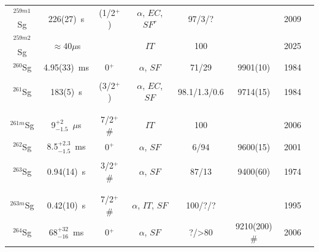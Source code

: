 \begin{center}
\begin{longtable}{c|ccccccl}
$^{259m1}$Sg& 226(27)~s		& (1/2$^+$)	&$\alpha$, $EC$, $SF^r$&97/3/?  &    		        &2009	&{\tiny\cite{Hessberger2009,Antalic2013,Antalic2015,Mosat2025}}\\
$^{259m2}$Sg&$\approx40\mu$s&       	&$IT$               &100        &                   &2025	&{\tiny\cite{Mosat2025}}\\
$^{260}$Sg	& 4.95(33)~ms	& 0$^+$	    &$\alpha$, $SF$		&71/29		&9901(10)		    &1984	&{\tiny\cite{Demin1984,Oganessian1984b,Muenzenberg1985,Muenzenberg1986,Muenzenberg1987,Hessberger2009}}\\
			&				&			&					&			& 				    &		&{\tiny\cite{Sato2011}}\\
$^{261}$Sg	&183(5)~s		& (3/2$^+$)	&$\alpha$, $EC$, $SF$&98.1/1.3/0.6&9714(15)		    &1984    &{\tiny\cite{Muenzenberg1984,Oganessian1984,Muenzenberg1985,Muenzenberg1987,Hofmann1995,Hofmann1997}}\\
			&				&			&					&			& 				    &		&{\tiny\cite{Hofmann1997a,Hofmann1998,Hessberger1999,Streicher2007,Hessberger2009,Berryman2010}}\\
			&				&			&					&			& 				    &		&{\tiny\cite{Berryman2011,Sato2011}}\\
$^{261m}$Sg	&9$^{+2}_{-1.5}$~$\mu$s&7/2$^+$\#&$IT$          &100        &       		    &2006   &{\tiny\cite{Antalic2006,Berryman2010}}\\
$^{262}$Sg	&8.5$^{+2.3}_{-1.5}$~ms&0$^+$&$\alpha$, $SF$    &6/94	    &9600(15)		    &2001	&{\tiny\cite{Hofmann2001,Gregorich2006,Nishio2006,Gregorich2006,Ackermann2011,Ackermann2011a}}\\
			&				&			&					&			& 				    &		&{\tiny\cite{Ackermann2015b,Ackermann2017}}\\
$^{263}$Sg	&0.94(14)~s     &3/2$^+$\#  &$\alpha$, $SF$		&87/13		&9400(60)		    &1974	&{\tiny\cite{Ghiorso1974,Druin1979,Gregorich1994,Lazarev1995,Hofmann1997,Hofmann1997a}}\\
			&				&			&					&			& 				    &		&{\tiny\cite{Ikezoe1998,Hofmann1998,Ginter2003,Folden2004,Morita2004a,Morimoto2004}}\\
			&				&			&					&			& 				    &		&{\tiny\cite{Morita2004,Gregorich2006,Nishio2006,Nishio2010,Morita2015}}\\
$^{263m}$Sg	&0.42(10)~s		&7/2$^+$\#  &$\alpha$, $IT$, $SF$&100/?/?   &				    &1995	&{\tiny\cite{Hofmann1997,Hofmann1997a,Hofmann1998,Ginter2003,Folden2004}}\\
$^{264}$Sg	& 68$^{+32}_{-16}$~ms& 0$^+$&$\alpha$, $SF$		&?/>80		&9210(200)$\#$	    &2006	&{\tiny\cite{Back1981,Ikezoe1998,Gregorich2006,Nishio2006,Graeger2010,Galkina2021}}\\

\end{longtable}
\end{center}
